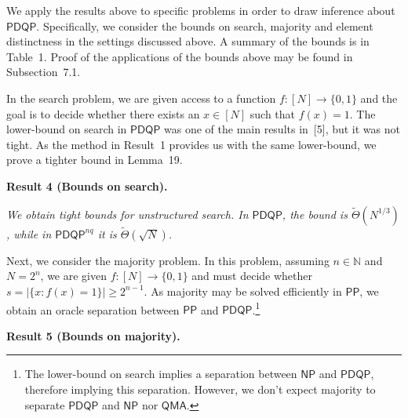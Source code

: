 We apply the results above to specific problems in order to draw inference about $\mathsf{PDQP}$. Specifically, we consider the bounds on search, majority and element distinctness in the settings discussed above. A summary of the bounds is in Table 1. Proof of the applications of the bounds above may be found in Subsection 7.1.\par




In the search problem, we are given access to a function $f:[N]\rightarrow\{0,1\}$ and the goal is to decide whether there exists an $x\in[N]$ such that $f(x)=1$. The lower-bound on search in $\mathsf{PDQP}$ was one of the main results in [5], but it was not tight. As the method in Result 1 provides us with the same lower-bound, we prove a tighter bound in Lemma 19.\par





\par\medskip\noindent\textbf{
\textbf{Result 4}\textbf{ }(\textbf{Bounds on search})\textbf{.}
}\par



\emph{We obtain tight bounds for unstructured search. In $\mathsf{PDQP}$, the bound is $\tilde{\Theta}(N^{1/3})$, while in $\mathsf{PDQP}^{nq}$ it is $\tilde{\Theta}(\sqrt{N})$.}\par






Next, we consider the majority problem. In this problem, assuming $n\in\mathbb{N}$ and $N=2^{n}$, we are given $f:[N]\rightarrow\{0,1\}$ and must decide whether $s=|\{x:f(x)=1\}|\geq 2^{n-1}$. As majority may be solved efficiently in $\mathsf{PP}$, we obtain an oracle separation between $\mathsf{PP}$ and $\mathsf{PDQP}$.\footnote{The lower-bound on search implies a separation between $\mathsf{NP}$ and $\mathsf{PDQP}$, therefore implying this separation. However, we don’t expect majority to separate $\mathsf{PDQP}$ and $\mathsf{NP}$ nor $\mathsf{QMA}$.}\par





\par\medskip\noindent\textbf{
\textbf{Result 5}\textbf{ }(\textbf{Bounds on majority})\textbf{.}
}\par



